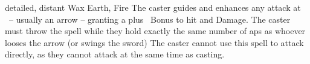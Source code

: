   {detailed, distant}%
  {Wax}%
  {Earth, Fire}%
  {}%
  {The caster guides and enhances any attack at \spellRange\ -- usually an arrow -- granting a plus~ Bonus to hit and Damage.
    The caster must throw the spell while they hold exactly the same number of \glspl{ap} as whoever looses the arrow (or swings the sword)}%
  {The caster cannot use this spell to attack directly, as they cannot attack at the same time as casting.}
